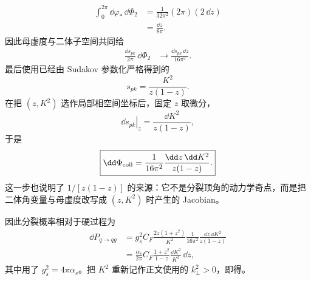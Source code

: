 \begin{derivation}
\begin{align*}
 \int_0^{2\pi}\dd\varphi_*\,\dd\Phi_2
 &=\frac{1}{32\pi^2}(2\pi)(2\,\dd z)\\
 &=\frac{\dd z}{8\pi}.
\end{align*}
因此母虚度与二体子空间共同给
\begin{align*}
 \frac{\dd s_{pk}}{2\pi}\,\dd\Phi_2
 &\longrightarrow
 \frac{\dd s_{pk}\,\dd z}{16\pi^2}.
\end{align*}
最后使用已经由 Sudakov 参数化严格得到的
\begin{equation*}
 s_{pk}=\frac{K^2}{z(1-z)}.
\end{equation*}
在把 $(z,K^2)$ 选作局部相空间坐标后，固定 $z$ 取微分，
\begin{equation*}
 \left.\dd s_{pk}\right|_z
 =\frac{\dd K^2}{z(1-z)},
\end{equation*}
于是
\begin{equation*}
 \boxed{
 \dd\Phi_{\rm coll}
 =\frac{1}{16\pi^2}
 \frac{\dd z\,\dd K^2}{z(1-z)}.}
\end{equation*}
这一步也说明了 $1/[z(1-z)]$ 的来源：它不是分裂顶角的动力学奇点，而是把二体角变量与母虚度改写成 $(z,K^2)$ 时产生的 Jacobian。

因此分裂概率相对于硬过程为
\begin{align*}
 \dd P_{q\to qg}
 &=g_s^2C_F\frac{2z(1+z^2)}{K^2}
 \frac{1}{16\pi^2}
 \frac{\dd z\,\dd K^2}{z(1-z)}\\
 &=\frac{\alpha_s}{2\pi}
 C_F\frac{1+z^2}{1-z}
 \frac{\dd K^2}{K^2}\,\dd z,
\end{align*}
其中用了 $g_s^2=4\pi\alpha_s$。把 $K^2$ 重新记作正文使用的 $k_\perp^2>0$，即得。
\end{derivation}
